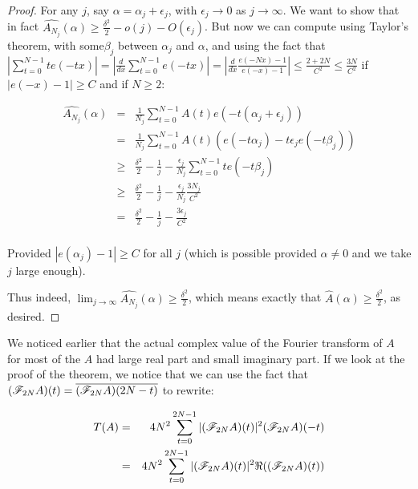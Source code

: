 \documentclass{report}
\theoremstyle{remark}
\numberwithin{equation}{section}
\begin{document}
{\begin{proof}
  For any $j$, say $\alpha = \alpha_j + \epsilon_j$, with
  $\epsilon_j \to 0$ as $j \to \infty$.  We want to show that in fact
  $\widehat{A_{N_j}}(\alpha) \geq \frac{\delta^2}{2} - o(j) -
  O(\epsilon_j)$.  But now we can compute using Taylor's theorem, with
  some$\beta_j$ between $\alpha_j$ and $\alpha$, and using the fact
  that
  $\left|\sum_{t=0}^{N-1} t e(-tx)\right| =
  \left|\frac{d}{dx}\sum_{t=0}^{N-1} e(-tx)\right| =
  \left|\frac{d}{dx} \frac{e(-Nx) -1}{e(-x)-1}\right| \leq
  \frac{2+2N}{C^2} \leq \frac{3N}{C^2}$ if $|e(-x)-1| \geq C$ and if
  $N \geq 2$:

  \begin{eqnarray*}
    \widehat{A_{N_j}}(\alpha) &=& \frac{1}{N_j} \sum_{t=0}^{N-1} A(t)
                                  e(-t(\alpha_j+\epsilon_j))\\
                              &=& \frac{1}{N_j} \sum_{t=0}^{N-1} A(t)
                                  (e(-t\alpha_j)-t\epsilon_je(-t\beta_j))\\
                              &\geq& \frac{\delta^2}{2} - \frac{1}{j}
                                     - \frac{\epsilon_j}{N_j} \sum_{t=0}^{N-1}
                                     t e(-t\beta_j)\\
                              &\geq& \frac{\delta^2}{2} - \frac{1}{j}
                                     - \frac{\epsilon_j}{N_j} \frac{3N_j}{C^2}\\
                              &=& \frac{\delta^2}{2} - \frac{1}{j}
                                  - \frac{3\epsilon_j}{C^2}\\
  \end{eqnarray*}

  Provided $|e(\alpha_j) - 1| \geq C$ for all $j$ (which is possible
  provided $\alpha \neq 0$ and we take $j$ large enough).

  Thus indeed,
  $\lim_{j \to \infty} \widehat{A_{N_j}}(\alpha) \geq
  \frac{\delta^2}{2}$, which means exactly that
  $\widehat{A}(\alpha) \geq \frac{\delta^2}{2}$, as desired.
\end{proof}
}
We noticed earlier that the actual complex value of the Fourier
transform of $A$ for most of the $A$ had large real part and small
imaginary part.  If we look at the proof of the theorem, we notice
that we can use the fact that
$(\mathscr{F}_{2N}A)(t) = \overline{(\mathscr{F}_{2N}A)(2N-t)}$ to rewrite:

\begin{eqnarray*}
T(A) &=& 4 N^2 \sum_{t=0}^{2N-1} |(\mathscr{F}_{2N}A)(t)|^2(\mathscr{F}_{2N}A)(-t)\\
 &=& 4 N^2 \sum_{t=0}^{2N-1} |(\mathscr{F}_{2N}A)(t)|^2\Re((\mathscr{F}_{2N}A)(t))
\end{eqnarray*}
\end{document}
